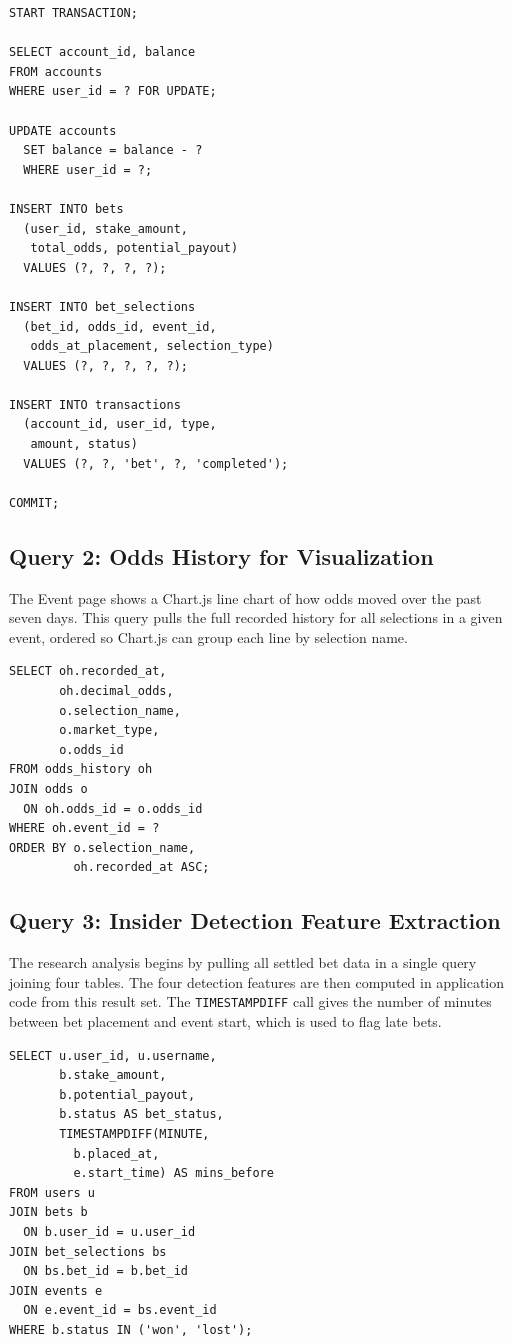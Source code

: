 \documentclass[sigconf,nonacm]{acmart}
\begin{document}
\begin{verbatim}
START TRANSACTION;

SELECT account_id, balance
FROM accounts
WHERE user_id = ? FOR UPDATE;

UPDATE accounts
  SET balance = balance - ?
  WHERE user_id = ?;

INSERT INTO bets
  (user_id, stake_amount,
   total_odds, potential_payout)
  VALUES (?, ?, ?, ?);

INSERT INTO bet_selections
  (bet_id, odds_id, event_id,
   odds_at_placement, selection_type)
  VALUES (?, ?, ?, ?, ?);

INSERT INTO transactions
  (account_id, user_id, type,
   amount, status)
  VALUES (?, ?, 'bet', ?, 'completed');

COMMIT;
\end{verbatim}

\subsection{Query 2: Odds History for Visualization}
The Event page shows a Chart.js line chart of how odds moved over
the past seven days. This query pulls the full recorded history for
all selections in a given event, ordered so Chart.js can group each
line by selection name.

\begin{verbatim}
SELECT oh.recorded_at,
       oh.decimal_odds,
       o.selection_name,
       o.market_type,
       o.odds_id
FROM odds_history oh
JOIN odds o
  ON oh.odds_id = o.odds_id
WHERE oh.event_id = ?
ORDER BY o.selection_name,
         oh.recorded_at ASC;
\end{verbatim}

\subsection{Query 3: Insider Detection Feature Extraction}
The research analysis begins by pulling all settled bet data in a
single query joining four tables. The four detection features are then
computed in application code from this result set. The
\texttt{TIMESTAMPDIFF} call gives the number of minutes between bet
placement and event start, which is used to flag late bets.

\begin{verbatim}
SELECT u.user_id, u.username,
       b.stake_amount,
       b.potential_payout,
       b.status AS bet_status,
       TIMESTAMPDIFF(MINUTE,
         b.placed_at,
         e.start_time) AS mins_before
FROM users u
JOIN bets b
  ON b.user_id = u.user_id
JOIN bet_selections bs
  ON bs.bet_id = b.bet_id
JOIN events e
  ON e.event_id = bs.event_id
WHERE b.status IN ('won', 'lost');
\end{verbatim}
\end{document}
